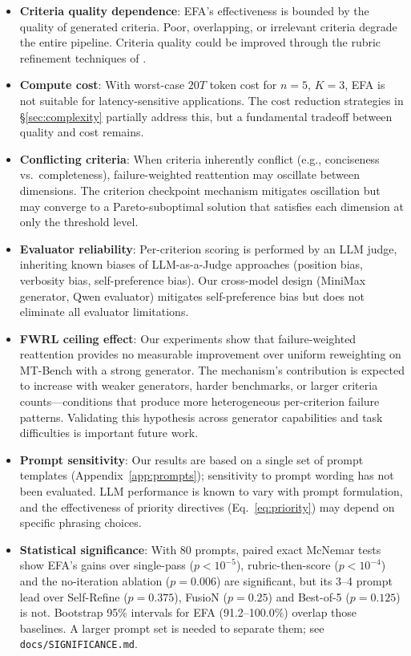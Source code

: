 \documentclass[11pt]{article}
\newcommand{\efa}{\textsc{EFA}}  %
\newcommand{\fwrl}{\textsc{FWRL}}
\begin{document}
\begin{itemize}[leftmargin=*]
    \item \textbf{Criteria quality dependence}: \efa{}'s effectiveness is bounded by the quality of generated criteria. Poor, overlapping, or irrelevant criteria degrade the entire pipeline. Criteria quality could be improved through the rubric refinement techniques of \citet{wang2026rrd}.
    \item \textbf{Compute cost}: With worst-case $20T$ token cost for $n=5$, $K=3$, \efa{} is not suitable for latency-sensitive applications. The cost reduction strategies in \S\ref{sec:complexity} partially address this, but a fundamental tradeoff between quality and cost remains.
    \item \textbf{Conflicting criteria}: When criteria inherently conflict (e.g., conciseness vs.\ completeness), failure-weighted reattention may oscillate between dimensions. The criterion checkpoint mechanism mitigates oscillation but may converge to a Pareto-suboptimal solution that satisfies each dimension at only the threshold level.
    \item \textbf{Evaluator reliability}: Per-criterion scoring is performed by an LLM judge, inheriting known biases of LLM-as-a-Judge approaches (position bias, verbosity bias, self-preference bias). Our cross-model design (MiniMax generator, Qwen evaluator) mitigates self-preference bias but does not eliminate all evaluator limitations.
    \item \textbf{\fwrl{} ceiling effect}: Our experiments show that failure-weighted reattention provides no measurable improvement over uniform reweighting on MT-Bench with a strong generator. The mechanism's contribution is expected to increase with weaker generators, harder benchmarks, or larger criteria counts---conditions that produce more heterogeneous per-criterion failure patterns. Validating this hypothesis across generator capabilities and task difficulties is important future work.
    \item \textbf{Prompt sensitivity}: Our results are based on a single set of prompt templates (Appendix~\ref{app:prompts}); sensitivity to prompt wording has not been evaluated. LLM performance is known to vary with prompt formulation, and the effectiveness of priority directives (Eq.~\ref{eq:priority}) may depend on specific phrasing choices.
    \item \textbf{Statistical significance}: With 80 prompts, paired exact McNemar tests show \efa{}'s gains over single-pass ($p<10^{-5}$), rubric-then-score ($p<10^{-4}$) and the no-iteration ablation ($p=0.006$) are significant, but its 3--4 prompt lead over Self-Refine ($p=0.375$), FusioN ($p=0.25$) and Best-of-5 ($p=0.125$) is not. Bootstrap 95\% intervals for \efa{} (91.2--100.0\%) overlap those baselines. A larger prompt set is needed to separate them; see \texttt{docs/SIGNIFICANCE.md}.

\end{itemize}
\end{document}
